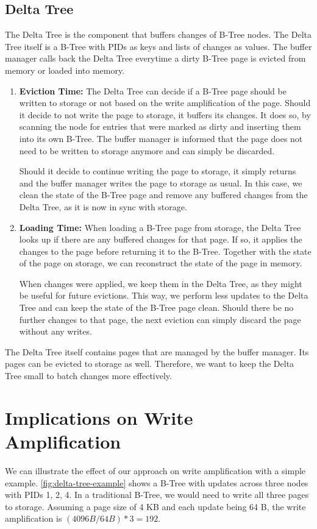 \subsection*{Delta Tree}
The Delta Tree is the component that buffers changes of B-Tree nodes.
The Delta Tree itself is a B-Tree with \ac{PID}s as keys and lists of changes as values.
The buffer manager calls back the Delta Tree everytime a dirty B-Tree page is evicted from memory or loaded into memory.

\begin{enumerate}
  \item \textbf{Eviction Time:}
The Delta Tree can decide if a B-Tree page should be written to storage or not based on the write amplification of the page.
Should it decide to not write the page to storage, it buffers its changes.
It does so, by scanning the node for entries that were marked as dirty and inserting them into its own B-Tree.
The buffer manager is informed that the page does not need to be written to storage anymore and can simply be discarded.

Should it decide to continue writing the page to storage, it simply returns and the buffer manager writes the page to storage as usual.
In this case, we clean the state of the B-Tree page and remove any buffered changes from the Delta Tree, as it is now in sync with storage.

  \item \textbf{Loading Time:}
When loading a B-Tree page from storage, the Delta Tree looks up if there are any buffered changes for that page.
If so, it applies the changes to the page before returning it to the B-Tree.
Together with the state of the page on storage, we can reconstruct the state of the page in memory.

When changes were applied, we keep them in the Delta Tree, as they might be useful for future evictions.
This way, we perform less updates to the Delta Tree and can keep the state of the B-Tree page clean.
Should there be no further changes to that page, the next eviction can simply discard the page without any writes.
\end{enumerate}

The Delta Tree itself contains pages that are managed by the buffer manager.
Its pages can be evicted to storage as well.
Therefore, we want to keep the Delta Tree small to batch changes more effectively.

\section{Implications on Write Amplification}
We can illustrate the effect of our approach on write amplification with a simple example.
\autoref{fig:delta-tree-example} shows a B-Tree with updates across three nodes with \ac{PID}s {1, 2, 4}.
In a traditional B-Tree, we would need to write all three pages to storage.
Assuming a page size of 4 KB and each update being 64 B, the write amplification is $(4096 B / 64 B) * 3 = 192$.


